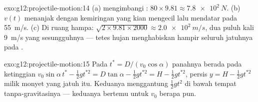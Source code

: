 \begin{solution}{exo:g12:projectile-motion:14}
(a)  mengimbangi : $80 \times 9.81 \approx \qty{7.8e2}{N}$.
(b) $v(t)$ menanjak dengan kemiringan yang kian mengecil lalu mendatar pada
\qty{55}{m/s}. (c) Di ruang hampa:
$\sqrt{2 \times 9.81 \times 2000} \approx \qty{2.0e2}{m/s}$, dua puluh
kali \qty{9}{m/s} yang sesungguhnya --- tetes hujan menghabiskan hampir
seluruh jatuhnya pada .
\end{solution}

\begin{solution}{exo:g12:projectile-motion:15}
Pada $t^* = D/(v_0\cos\alpha)$ panahnya berada pada ketinggian
$v_0\sin\alpha\, t^* - \tfrac12 g t^{*2} = D\tan\alpha - \tfrac12 g
t^{*2} = H - \tfrac12 g t^{*2}$, persis $y = H - \tfrac12 g t^{*2}$
milik monyet yang jatuh itu. Keduanya menggantung $\tfrac12 gt^2$ di bawah
tempat tanpa-gravitasinya --- keduanya bertemu untuk $v_0$ berapa pun.
\end{solution}

